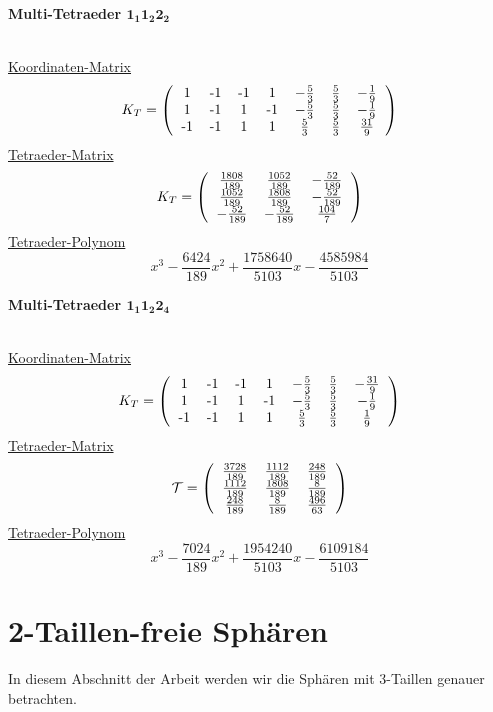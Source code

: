 \documentclass[12pt,titlepage,twoside,cleardoublepage]{article}
\theoremstyle{nummermitklammern}
\numberwithin{equation}{section}
\begin{document}
 \begin{large}
 \textbf{Multi-Tetraeder $\textbf{1}_\textbf{1}\textbf{1}_\textbf{2}\textbf{2}_\textbf{2}$}
 \end{large}\\
 \underline{Koordinaten-Matrix}
\[
K_T=\left(\begin{tabular}{ccccccc}
 1&-1&-1&1&$-\frac{5}{3}$&$\frac{5}{3}$&$-\frac{1}{9}$\\
 1&-1&1&-1&$-\frac{5}{3}$&$\frac{5}{3}$&$-\frac{1}{9}$\\
-1&-1&1&1&$\frac{5}{3}$&$\frac{5}{3}$&$\frac{31}{9}$\\
\end{tabular}\right)
\] 
\underline{Tetraeder-Matrix}
\[
K_T=\left(\begin{tabular}{ccc}
$\frac{1808}{189}$& $\frac{1052}{189}$& $-\frac{52}{189}$ \\
 $\frac{1052}{189}$& $\frac{1808}{189}$& $-\frac{52}{189}$ \\
 $-\frac{52}{189}$& $-\frac{52}{189}$& $\frac{104}{7}$ \\ 
\end{tabular}\right)
\]
\underline{Tetraeder-Polynom}
\[
  x^3-\frac{6424}{189}x^2+\frac{1758640}{5103}x-\frac{4585984}{5103}
\]
 \begin{large}
 \textbf{Multi-Tetraeder $\textbf{1}_\textbf{1}\textbf{1}_\textbf{2}\textbf{2}_\textbf{4}$}
 \end{large}\\
\underline{Koordinaten-Matrix} 
 \[
K_T=\left(\begin{tabular}{ccccccc}
 1&-1&-1&1&$-\frac{5}{3}$&$\frac{5}{3}$&$-\frac{31}{9}$\\
 1&-1&1&-1&$-\frac{5}{3}$&$\frac{5}{3}$&$-\frac{1}{9}$\\
-1&-1&1&1&$\frac{5}{3}$&$\frac{5}{3}$&$\frac{1}{9}$\\
\end{tabular}\right)
\] 
\underline{Tetraeder-Matrix}
\[
\mathcal{T}=\left(\begin{tabular}{ccc}
 $\frac{3728}{189}$&$\frac{1112}{189}$& $\frac{248}{189}$\\
 $\frac{1112}{189}$& $\frac{1808}{189}$& $\frac{8}{189}$ \\
 $\frac{248}{189}$& $\frac{8}{189}$&$\frac{ 496}{63}$ \\
\end{tabular}\right)
\]
\underline{Tetraeder-Polynom}
\[
  x^3-\frac{7024}{189}x^2+\frac{1954240}{5103}x-\frac{6109184}{5103} 
\] 
 \section{2-Taillen-freie Sphären}
In diesem Abschnitt der Arbeit werden wir die Sphären mit 3-Taillen genauer betrachten. 
\end{document}
